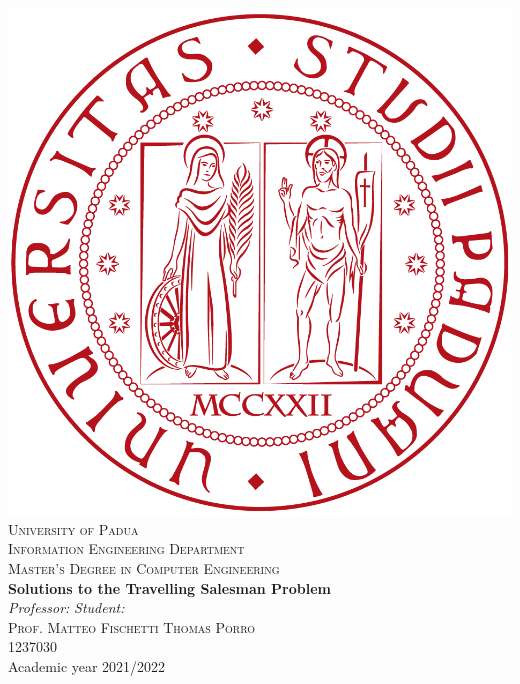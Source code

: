 



\begin{titlepage}
\begin{center}
\includegraphics[scale=0.1]{images/logo.png}\\

\vspace{0.8cm}
\textsc{\LARGE University of Padua}\\
\vspace{0.45cm}
\textsc{\large Information Engineering Department}\\
\vspace{0.4cm}
\textsc{\large Master’s Degree in Computer Engineering}\\
\vfill
{ \LARGE \bfseries Solutions to the Travelling Salesman Problem
}\\
\vfill
\textit{\large Professor:} \hfill \textit{\large Student:}\\
\textsc{\large Prof. Matteo Fischetti} \hfill \textsc{Thomas Porro}\\
\hfill \textsc{1237030}\\

\vfill
{\large Academic year 2021/2022}
\end{center}
\end{titlepage}

